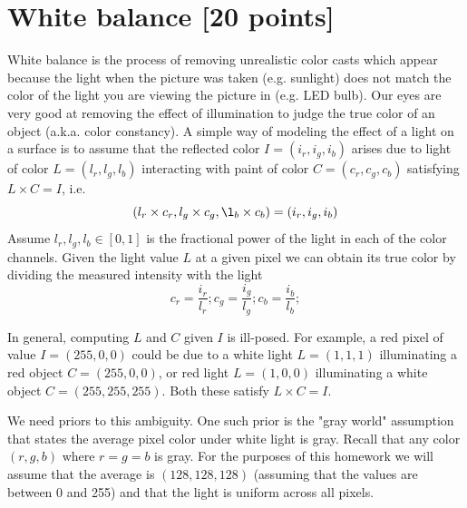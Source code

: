 \documentclass[10pt,letterpaper]{article}
\begin{document}
\section{White balance [20 points]}
White balance is the process of removing unrealistic color casts which appear because the light when the picture was taken (e.g. sunlight) does not match the color of the light you are viewing the picture in (e.g. LED bulb). Our eyes are very good at removing the effect of illumination to judge the true color of an object (a.k.a. color constancy). A simple way of modeling the effect of a light on a surface is to assume that the reflected color $I = (i_r,i_g,i_b)$ arises due to light of color $L= (l_r,l_g,l_b)$ interacting with paint of color $C = (c_r,c_g,c_b)$ satisfying  
	$L \times C = I$, i.e. 
	\[ (l_r \times c_r,l_g \times c_g ,\l_b \times c_b) = (i_r,i_g,i_b)
	\]
Assume $l_r, l_g, l_b \in [0, 1]$ is the fractional power of the light in each of the color channels. Given the light value $L$ at a given pixel we can obtain its true color by dividing the measured intensity with the light 
\[
	c_r = \frac{i_r}{l_r}; 
	c_g = \frac{i_g}{l_g}; 
	c_b = \frac{i_b}{l_b}; 
\]

In general, computing $L$ and $C$ given $I$ is ill-posed. For example, a red pixel of value $I=(255,0,0)$ could be due to a white light $L=(1,1,1)$ illuminating a red object $C=(255,0,0)$, or red light $L=(1,0,0)$ illuminating a white object $C=(255,255,255)$. Both these satisfy $L\times C = I$.

We need priors to this ambiguity. One such prior is the "gray world" assumption that states the average pixel color under white light is gray. Recall that any color $(r,g,b)$ where $r=g=b$ is gray. For the purposes of this homework we will assume that the average is $(128,128,128)$ (assuming that the values are between 0 and 255) and that the light is uniform across all pixels.
\end{document}
